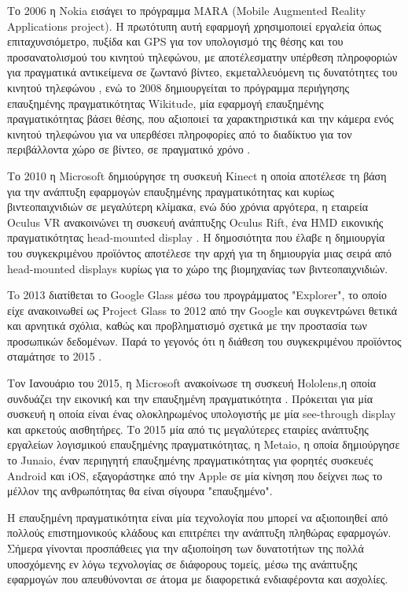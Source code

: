Το 2006 η Nokia εισάγει το πρόγραμμα MARA (Mobile Augmented Reality Applications project). H πρωτότυπη αυτή εφαρμογή χρησιμοποιεί εργαλεία όπως επιταχυνσιόμετρο, πυξίδα και GPS για τον υπολογισμό της θέσης και του προσανατολισμού του κινητού τηλεφώνου, με αποτέλεσματην υπέρθεση πληροφοριών για πραγματικά αντικείμενα σε ζωντανό βίντεο, εκμεταλλευόμενη τις δυνατότητες του κινητού τηλεφώνου \cite{kahari2006mara}, ενώ το 2008 δημιουργείται το πρόγραμμα περιήγησης επαυξημένης πραγματικότητας Wikitude, μία εφαρμογή επαυξημένης πραγματικότητας βάσει θέσης, που αξιοποιεί τα χαρακτηριστικά και την κάμερα ενός κινητού τηλεφώνου για να υπερθέσει πληροφορίες από το διαδίκτυο για τον περιβάλλοντα χώρο σε βίντεο, σε πραγματικό χρόνο \cite{wikitude}.


Το 2010 η Microsoft δημιούργησε τη συσκευή Kinect η οποία αποτέλεσε τη βάση για την ανάπτυξη εφαρμογών επαυξημένης πραγματικότητας \cite{zhang2012microsoft} και κυρίως βιντεοπαιχνιδιών σε μεγαλύτερη κλίμακα, ενώ δύο χρόνια αργότερα, η εταιρεία Oculus VR ανακοινώνει τη συσκευή ανάπτυξης Oculus Rift, ένα HMD εικονικής πραγματικότητας head-mounted display \cite{oculus}. Η δημοσιότητα που έλαβε η δημιουργία του συγκεκριμένου προϊόντος αποτέλεσε την αρχή για τη δημιουργία μιας σειρά από head-mounted displays κυρίως για το χώρο της βιομηχανίας των βιντεοπαιχνιδιών.


To 2013 διατίθεται το Google Glass μέσω του προγράμματος "Explorer", το οποίο είχε ανακοινωθεί ως Project Glass το 2012 από την Google και συγκεντρώνει θετικά και αρνητικά σχόλια, καθώς και προβληματισμό σχετικά με την προστασία των προσωπικών δεδομένων. Παρά το γεγονός ότι η διάθεση του συγκεκριμένου προϊόντος σταμάτησε το 2015 \cite{glass}.


Τον Ιανουάριο του 2015, η Microsoft ανακοίνωσε τη συσκευή Hololens,η οποία συνδυάζει την εικονική και την επαυξημένη πραγματικότητα \cite{hololens}. Πρόκειται για μία συσκευή η οποία είναι ένας ολοκληρωμένος υπολογιστής με μία see-through display και αρκετούς αισθητήρες. Το 2015 μία από τις μεγαλύτερες εταιρίες ανάπτυξης εργαλείων λογισμικού επαυξημένης πραγματικότητας, η Metaio, η οποία δημιούργησε το Junaio, έναν περιηγητή επαυξημένης πραγματικότητας για φορητές συσκευές Android και iOS, εξαγοράστηκε από την Apple σε μία κίνηση\cite{applemetaio} που δείχνει πως το μέλλον της ανθρωπότητας θα είναι σίγουρα "επαυξημένο". 


Η επαυξημένη πραγματικότητα είναι μία τεχνολογία που μπορεί να αξιοποιηθεί από πολλούς επιστημονικούς κλάδους και επιτρέπει την ανάπτυξη πληθώρας εφαρμογών. Σήμερα γίνονται προσπάθειες για την αξιοποίηση των δυνατοτήτων της πολλά υποσχόμενης εν λόγω τεχνολογίας σε διάφορους τομείς, μέσω της ανάπτυξης εφαρμογών που απευθύνονται σε άτομα με διαφορετικά ενδιαφέροντα και ασχολίες.




